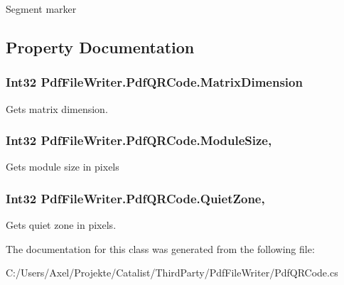 Segment marker 



\subsection{Property Documentation}
\subsubsection[{\texorpdfstring{Matrix\+Dimension}{MatrixDimension}}]{\setlength{\rightskip}{0pt plus 5cm}Int32 Pdf\+File\+Writer.\+Pdf\+Q\+R\+Code.\+Matrix\+Dimension\hspace{0.3cm}{\ttfamily [get]}}\hypertarget{class_pdf_file_writer_1_1_pdf_q_r_code_a19fe9c90a11671df950a17ffaf000dcd}{}\label{class_pdf_file_writer_1_1_pdf_q_r_code_a19fe9c90a11671df950a17ffaf000dcd}


Gets matrix dimension. 

\subsubsection[{\texorpdfstring{Module\+Size}{ModuleSize}}]{\setlength{\rightskip}{0pt plus 5cm}Int32 Pdf\+File\+Writer.\+Pdf\+Q\+R\+Code.\+Module\+Size\hspace{0.3cm}{\ttfamily [get]}, {\ttfamily [set]}}\hypertarget{class_pdf_file_writer_1_1_pdf_q_r_code_ac57e47763e02cc125712d36d3ee0cbb4}{}\label{class_pdf_file_writer_1_1_pdf_q_r_code_ac57e47763e02cc125712d36d3ee0cbb4}


Gets module size in pixels 

\subsubsection[{\texorpdfstring{Quiet\+Zone}{QuietZone}}]{\setlength{\rightskip}{0pt plus 5cm}Int32 Pdf\+File\+Writer.\+Pdf\+Q\+R\+Code.\+Quiet\+Zone\hspace{0.3cm}{\ttfamily [get]}, {\ttfamily [set]}}\hypertarget{class_pdf_file_writer_1_1_pdf_q_r_code_abd6ef31fa2de6c82296a7bab9a009066}{}\label{class_pdf_file_writer_1_1_pdf_q_r_code_abd6ef31fa2de6c82296a7bab9a009066}


Gets quiet zone in pixels. 



The documentation for this class was generated from the following file\+:\begin{DoxyCompactItemize}
\item 
C\+:/\+Users/\+Axel/\+Projekte/\+Catalist/\+Third\+Party/\+Pdf\+File\+Writer/Pdf\+Q\+R\+Code.\+cs\end{DoxyCompactItemize}
